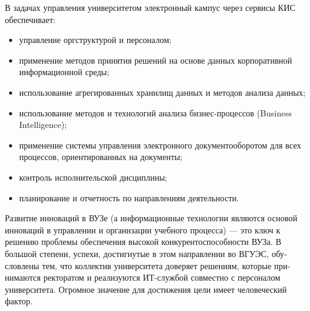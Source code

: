 В задачах управления университетом электронный кампус через сервисы КИС обеспечивает:
 \begin{itemize}
	\item управление оргструктурой и персоналом;
	\item применение методов принятия решений на основе данных корпоративной информационной среды;
	\item использование агрегированных хранилищ данных и методов анализа данных;
	\item использование методов и технологий анализа бизнес-процессов (Business Intelligence);
	\item применение системы управления электронного документооборотом для всех процессов, ориентированных на документы;
	\item контроль исполнительской дисциплины;
	\item планирование и отчетность по направлениям деятельности.
\end{itemize}
Развитие инноваций в ВУЗе (а информационные технологии являются осно­вой инноваций в управлении и организации учебного процесса) — это ключ к решению проблемы обеспечения высокой конкурентоспособности ВУЗа. В большой степени, успехи, достигнутые в этом направлении во ВГУЭС, обу­словлены тем, что коллектив университета доверяет решениям, которые при­нимаются ректоратом и реализуются ИТ-службой совместно с персоналом университета. Огромное значение для достижения цели имеет человеческий фактор.